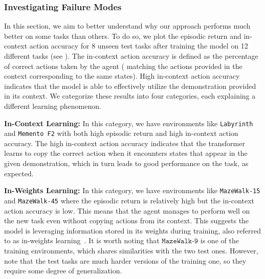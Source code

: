 \subsubsection{Investigating Failure Modes}
\vspace{-1mm}
\label{sec:env_difficulty}

In this section, we aim to better understand why our approach performs much better on some tasks than others. To do so, we plot the episodic return and in-context action accuracy for 8 unseen test tasks after training the model on 12 different tasks (see ). The in-context action accuracy is defined as the percentage of correct actions taken by the agent (\ie{} matching the actions provided in the context corresponding to the same states). High in-context action accuracy indicates that the model is able to effectively utilize the demonstration provided in its context. 
We categorize these results into four categories, each explaining a different learning phenomenon. 

\textbf{In-Context Learning:} In this category, we have environments like \texttt{Labyrinth} and \texttt{Memento F2} with both high episodic return and high in-context action accuracy. The high in-context action accuracy indicates that the transformer learns to copy the correct action when it encounters states that appear in the given demonstration, which in turn leads to good performance on the task, as expected.

\textbf{In-Weights Learning:} In this category, we have environments like \texttt{MazeWalk-15} and \texttt{MazeWalk-45} where the episodic return is relatively high but the in-context action accuracy is low. This means that the agent manages to perform well on the new task even without copying actions from its context. This suggests the model is leveraging information stored in its weights during training, also referred to as in-weights learning~\citep{zipfian_icl}. It is worth noting that $\texttt{MazeWalk-9}$ is one of the training environments, which shares similarities with the two test ones. However, note that the test tasks are much harder versions of the training one, so they require some degree of generalization. 


